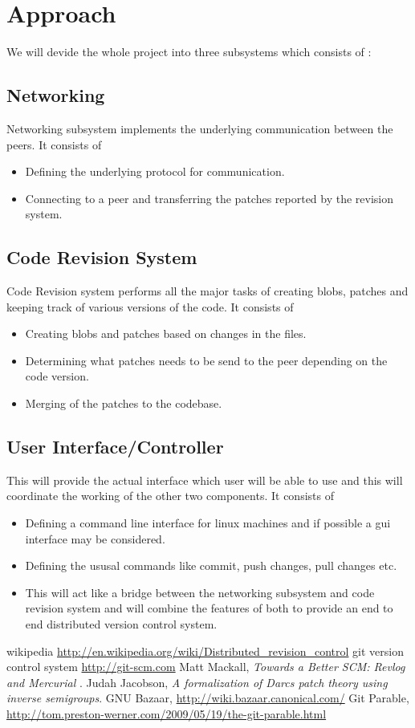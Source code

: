 \documentclass[]{article}
\begin{document}
\section{Approach}
We will devide the whole project into three subsystems which consists of :

\subsection{Networking}
Networking subsystem implements the underlying communication between the
peers. It consists of
\begin{itemize}
\item Defining the underlying protocol for communication.
\item Connecting to a peer and transferring the patches reported by the
  revision system.
\end{itemize}
\subsection{Code Revision System}
Code Revision system performs all the major tasks of creating blobs, patches and
keeping track of various versions of the code. It consists of
\begin{itemize}
\item Creating blobs and patches based on changes in the files.
\item Determining what patches needs to be send to the peer depending on the
  code version.
\item Merging of the patches to the codebase.
\end{itemize}
\subsection{User Interface/Controller}
This will provide the actual interface which user will be able to use and this
will coordinate the working of the other two components.
It consists of
\begin{itemize}
\item Defining a command line interface for linux machines and if possible a
  gui interface may be considered.
\item Defining the ususal commands like commit, push changes, pull changes
  etc.
\item This will act like a bridge between the networking subsystem and code
  revision system and will combine the features of both to provide an end to
  end distributed version control system.
\end{itemize}

\begin{thebibliography}{99}
wikipedia \url{http://en.wikipedia.org/wiki/Distributed_revision_control}
git version control system \url{http://git-scm.com}
Matt Mackall, \emph{Towards a Better SCM: Revlog and Mercurial} .
Judah Jacobson, \emph{A formalization of Darcs patch theory using inverse
  semigroups}.
GNU Bazaar, \url{http://wiki.bazaar.canonical.com/}
Git Parable, \url{http://tom.preston-werner.com/2009/05/19/the-git-parable.html}
\end{thebibliography}
\end{document}
